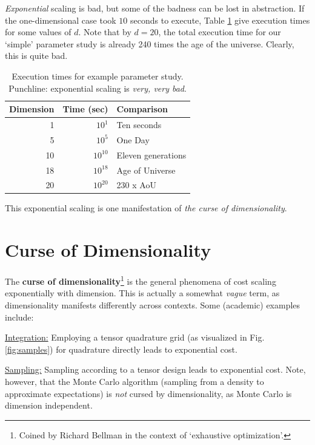 \documentclass{article}
\begin{document}
\emph{Exponential} scaling is bad, but some of the badness can be lost in
abstraction. If the one-dimensional case took $10$ seconds to execute, Table
\ref{tab:exponential} give execution times for some values of $d$. Note that by
$d=20$, the total execution time for our `simple' parameter study is already 240
times the age of the universe. Clearly, this is quite bad.

\begin{table}[!ht]
  \centering
  \begin{tabular}{r|r|l}
  \hline
  Dimension & Time (sec) & Comparison\\
  \hline
  1 & $10^{1}$ & Ten seconds\\
  \hline
  5 & $10^{5}$ & One Day\\
  \hline
  10 & $10^{10}$ & Eleven generations\\
  \hline
  18 & $10^{18}$ & Age of Universe\\
  \hline
  20 & $10^{20}$ & 230 x AoU\\
  \hline
  \end{tabular}
  \caption{Execution times for example parameter study. Punchline: exponential
    scaling is \emph{very, very bad}.}
  \label{tab:exponential}
\end{table}

This exponential scaling is one manifestation of \emph{the curse of
  dimensionality}.

\section{Curse of Dimensionality}
The \textbf{curse of dimensionality}\footnote{Coined by Richard Bellman in the
  context of `exhaustive optimization'.} is the general phenomena of cost
scaling exponentially with dimension. This is actually a somewhat \emph{vague}
term, as dimensionality manifests differently across
contexts.\cite{donoho2000high} Some (academic) examples include:

\bigskip\noindent\underline{Integration:} Employing a tensor quadrature grid (as
visualized in Fig. \ref{fig:samples}) for quadrature directly leads to
exponential cost.

\bigskip\noindent\underline{Sampling:} Sampling according to a tensor design
leads to exponential cost. Note, however, that the Monte Carlo algorithm
(sampling from a density to approximate expectations) is \emph{not} cursed by
dimensionality, as Monte Carlo is dimension
independent.\cite{owen2013montecarlo}
\end{document}
